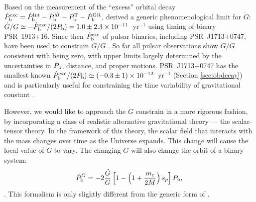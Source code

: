 Based on the measurement of the ``excess'' orbital decay 
$\dot{P}_{\rm b}^{\rm exc}=\dot{P}_{\rm b}^{\rm Int} - \dot{P}_{\rm
b}^{\dot{M}}  - \dot{P}_{\rm b}^{\rm T} - \dot{P}_{\rm b}^{\rm GR}$,
\citet{dgt88} derived a generic phenomenological limit for $\dot{G}$: 
$\dot{G}/G\simeq-\dot{P}_{\rm b}^{\rm exc}/(2P_{\rm
b})=1.0\pm2.3\times10^{-11}$~yr$^{-1}$ using timing of binary PSR~1913+16. 
{\bfref Since then $\dot{P}_{\rm b}^{\rm exc}$ of pulsar binaries, including 
PSR~J1713+0747, have been used to 
constrain $\dot{G}/G$ \citep{ktr94, lwj+09, fwe+12, nss+05}. }
So far all pulsar observations show $\dot{G}/G$ consistent with being zero, with 
upper limits largely determined by the uncertainties in $\dot P_{\rm b}$, distance, 
and proper motions.
PSR~J1713+0747 has the smallest known $\dot{P}_{\rm b}^{\rm exc}/(2P_{\rm
b})\simeq(-0.3\pm1)\times10^{-12}$~yr$^{-1}$ (Section \ref{sec:obdecay}) and is
particularly useful for constraining the time variability of gravitational
constant .

However, we would like to approach the $\dot{G}$ constrain in a more rigorous fashion,
by incorporating a class of realistic alternative gravitational theory --- the 
scalar-tensor theory.
In the framework of this theory,
the scalar field that interacts with the mass changes over time as the
Universe expands. This change will cause the local value of
$G$ to vary. The changing $G$ will also change
the orbit of a binary system:
\begin{equation}
\dot{P}_{\rm b}^{\dot{G}} = -2 \frac{\dot{G}}{G}
\left[1-\left( 1+\frac{m_c}{2M}\right) s_p\right]P_{\rm b},
\end{equation} \citep{nor90}.
This formalism is only slightly different from the generic form of
\citet{dgt88}.

